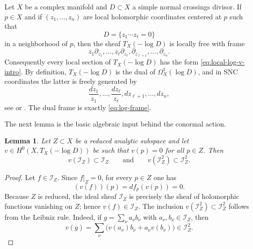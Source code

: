 \documentclass[12pt,a4paper,dvipsnames,x11names]{amsart}
\numberwithin{equation}{section}
\theoremstyle{plain}
\newtheorem{lemma}[theorem]{Lemma}
\theoremstyle{definition}
\theoremstyle{remark}
\newcommand{\II}{\mathscr I}
\begin{document}
Let $X$ be a complex manifold and $D\subset X$ a simple normal crossings divisor. If $p\in X$ and if $(z_1,\dots,z_n)$ are local holomorphic coordinates centered at $p$ such that
\begin{equation}\label{eq:snc-local}
D=\{z_1\cdots z_\ell=0\}
\end{equation}
in a neighborhood of $p$, then the sheaf $T_X(-\log D)$ is locally free with frame
\begin{equation}\label{eq:log-frame}
z_1\partial_{z_1},\dots,z_\ell\partial_{z_\ell},\partial_{z_{\ell+1}},\dots,\partial_{z_n}.
\end{equation}
Consequently every local section of $T_X(-\log D)$ has the form \eqref{eq:local-log-v-intro}. 
By definition, $T_X(-\log D)$ is the dual of $\Omega_X^1(\log D)$, and in SNC coordinates the latter is freely generated by
\begin{equation}\label{eq:log-forms-local}
\frac{dz_1}{z_1},\dots,\frac{dz_\ell}{z_\ell},dz_{\ell+1},\dots,dz_n,
\end{equation}
see \cite[\S 2]{Saito80} or \cite[\S 6]{Deligne70}. The dual frame is exactly \eqref{eq:log-frame}.


The next lemma is the basic algebraic input behind the conormal action.

\begin{lemma}\label{lem:ideal-preserved}
Let $Z\subset X$ be a reduced analytic subspace and let $v\in H^0(X,T_X(-\log D))$ be such that $v(p)=0$ for all $p\in Z$. Then
\begin{equation}\label{eq:ideal-preserved}
v(\II_Z)\subset \II_Z
\qquad \text{and} \qquad
v(\II_Z^2)\subset \II_Z^2.
\end{equation}
\end{lemma}

\begin{proof}
Let $f\in \II_Z$. Since $f|_Z=0$, for every $p\in Z$ one has
\begin{equation}\label{eq:derivative-zero}
(v(f))(p)=df_p(v(p))=0.
\end{equation}
Because $Z$ is reduced, the ideal sheaf $\II_Z$ is precisely the sheaf of holomorphic functions vanishing on $Z$; hence $v(f)\in \II_Z$. The inclusion $v(\II_Z^2)\subset \II_Z^2$ follows from the Leibniz rule. Indeed, if $g=\sum_\nu a_\nu b_\nu$ with $a_\nu,b_\nu\in \II_Z$, then
\begin{equation}\label{eq:leibniz-I2}
v(g)=\sum_\nu \big(v(a_\nu)b_\nu+a_\nu v(b_\nu)\big)\in \II_Z^2.
\end{equation}
\end{proof}
\end{document}
